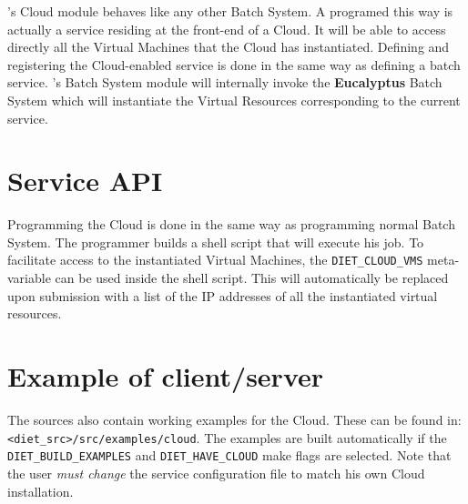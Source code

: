 \diet's Cloud module behaves like any other Batch System. A \sed programed this way
is actually a service residing at the front-end of a Cloud. It will be able to access
directly all the Virtual Machines that the Cloud has instantiated.
Defining and registering the Cloud-enabled \diet service is done in the same way as
defining a batch service. \diet's Batch System module will internally invoke the
\textbf{Eucalyptus} Batch System which will instantiate the Virtual Resources
corresponding to the current service.

\section{Service API}

Programming the \sed Cloud is done in the same way as programming normal Batch System.
The programmer builds a shell script that will execute his job. To facilitate access
to the instantiated Virtual Machines, the \verb!DIET_CLOUD_VMS! meta-variable can
be used inside the shell script. This will automatically be replaced upon submission
with a list of the IP addresses of all the instantiated virtual resources.

\section{Example of client/server}

The \diet sources also contain working examples for the \sed Cloud. These can be
found in: \verb!<diet_src>/src/examples/cloud!. The examples are built automatically
if the \verb!DIET_BUILD_EXAMPLES! and \verb!DIET_HAVE_CLOUD! make flags are selected.
Note that the user {\it must change} the service configuration file to match his
own Cloud installation.

